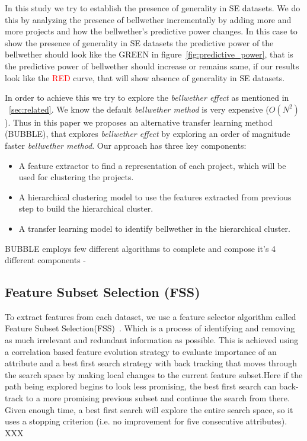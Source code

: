 \documentclass[sigconf]{acmart}
\newcommand{\bi}{\begin{itemize}[leftmargin=0.4cm]}
\newcommand{\ei}{\end{itemize}}
\theoremstyle{break}
\begin{document}
In this study we try to establish the presence of generality in SE datasets. We do this by analyzing the presence of bellwether incrementally by adding more and more projects and how the bellwether's predictive power changes. In this case to show the presence of generality in SE datasets the predictive power of the bellwether should look like the \textcolor{ao(english)}{GREEN} in figure~\ref{fig:predictive_power}, that is the predictive power of bellwether should increase or remains same, if our results look like the \textcolor{red}{RED} curve, that will show absence of generality in SE datasets.

In order to achieve this we try to explore the \textit{bellwether effect} as mentioned in ~\ref{sec:related}. We know the default \textit{bellwether method} is very expensive ($ O(N^2) $). Thus in this paper we proposes an alternative transfer learning method (BUBBLE), that explores \textit{bellwether effect} by exploring an order of magnitude faster \textit{bellwether method}. Our approach has three key components:

\bi

    \item A feature extractor to find a representation of each project, which will be used for clustering the projects. 
    
    \item A hierarchical clustering model to use the features extracted from previous step to build the hierarchical cluster.
    
    \item A transfer learning model to identify bellwether in the hierarchical cluster.

\ei

BUBBLE employs few different algorithms to complete and compose it's 4 different components - 

\subsection{Feature Subset Selection (FSS)}
\label{subsec:FSS}
To extract features from each dataset, we use a feature selector algorithm called Feature Subset Selection(FSS)~\cite{hall1999correlation,hall1997feature}. Which is a process of identifying and removing as much irrelevant and redundant information as possible. This is achieved using a correlation based feature evolution strategy to evaluate importance of an attribute and a best first search strategy with back tracking that moves through the search space by making local changes to the current feature subset.Here if the path being explored begins to look less promising, the best first search can back-track to a more promising previous subset and continue the search from there. Given enough time, a best first search will explore the entire search space, so it uses a stopping criterion (i.e. no improvement for five consecutive attributes). XXX
\end{document}
